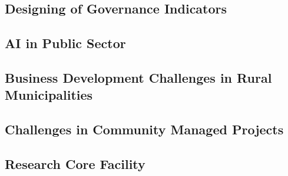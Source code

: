 \subsection{Designing of Governance Indicators}

\subsection{AI in Public Sector}

\subsection{Business Development Challenges in Rural Municipalities}

\subsection{Challenges in Community Managed Projects}

\subsection{Research Core Facility}

